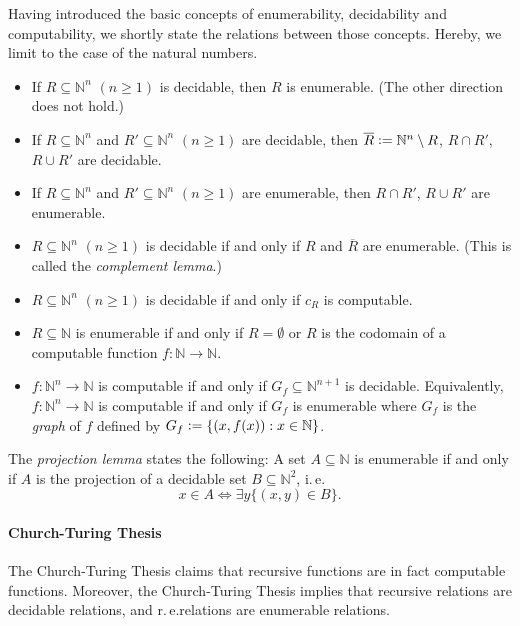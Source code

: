 Having introduced the basic concepts of enumerability, decidability and computability, we shortly state the relations between those concepts. Hereby, we limit to the case of the natural numbers.
\begin{itemize}
\item If $R \subseteq \mathbb{N}^n$ $(n \ge 1)$ is decidable, then $R$ is enumerable. (The other direction does not hold.)
\item If $R\subseteq \mathbb{N}^n$ and $R'\subseteq \mathbb{N}^n$ $(n \ge 1)$ are decidable, then $\overline{R} \vcentcolon= \mathbb{N}^n\setminus R$, $R \cap R'$, $R \cup R'$ are decidable.
\item If $R\subseteq \mathbb{N}^n$ and $R'\subseteq \mathbb{N}^n$ $(n \ge 1)$ are enumerable, then $R \cap R'$, $R \cup R'$ are enumerable.
\item $R\subseteq \mathbb{N}^n$ $(n \ge 1)$ is decidable if and only if $R$ and $\overline{R}$ are enumerable. (This is called the \textit{complement lemma}.)
\item $R\subseteq \mathbb{N}^n$ $(n \ge 1)$ is decidable if and only if $c_R$ is computable.
\item $R\subseteq \mathbb{N}$ is enumerable if and only if $R = \emptyset$ or $R$ is the codomain of a computable function $f: \mathbb{N} \rightarrow \mathbb{N}$.
\item $f:\mathbb{N}^n \rightarrow \mathbb{N}$ is computable if and only if $G_f \subseteq \mathbb{N}^{n+1}$ is decidable. Equivalently, $f:\mathbb{N}^n \rightarrow \mathbb{N}$ is computable if and only if $G_f$ is enumerable where $G_f$ is the \textit{graph} of $f$ defined by $G_f \vcentcolon= \lbrace (x, f(x)):x\in \mathbb{N} \rbrace$.
\end{itemize}

The \textit{projection lemma} states the following:
A set $A\subseteq \mathbb{N}$ is enumerable if and only if $A$ is the projection of a decidable set $B \subseteq \mathbb{N}^2$, i.\,e.\@
\[ x \in A \Leftrightarrow \exists y \lbrace (x,y) \in B \rbrace. \]




\paragraph{Church-Turing Thesis}
The Church-Turing Thesis claims that recursive functions are in fact computable functions. Moreover, the Church-Turing Thesis implies that recursive relations are decidable relations, and r.\,e.\@ relations are enumerable relations.


